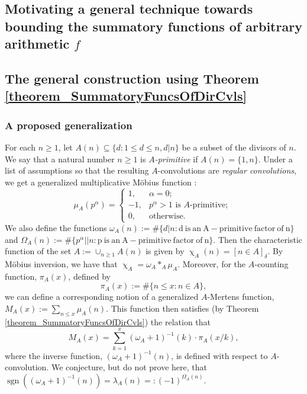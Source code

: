 \documentclass[11pt,reqno,a4letter]{article}
\numberwithin{figure}{section}
\numberwithin{table}{section}
\newcommand{\Iverson}[1]{\ensuremath{\left[#1\right]_{\delta}}}
\renewcommand{\chi}{\upchi}
\theoremstyle{plain}
\numberwithin{theorem}{section}
\theoremstyle{definition}
\begin{document}
\subsection{Motivating a general technique towards bounding the summatory functions of arbitrary arithmetic $f$} 

\subsection{The general construction using Theorem \ref{theorem_SummatoryFuncsOfDirCvls}} 


\subsubsection{A proposed generalization} 

For each $n \geq 1$, let $A(n) \subseteq \{d: 1 \leq d \leq n, d|n\}$ be a subset of the 
divisors of $n$. We say that a natural number $n \geq 1$ is \emph{$A$-primitive} if $A(n) = \{1, n\}$. 
Under a list of assumptions so that the resulting $A$-convolutions are \emph{regular convolutions}, 
we get a generalized multiplicative M\"obius function \cite[\S 2.2]{HANDBOOKNT-2004}: 
\[
\mu_A(p^{\alpha}) = \begin{cases} 
     1, & \alpha = 0; \\ 
     -1, & p^{\alpha} > 1\text{\ is $A$-primitive; } \\ 
     0, & \text{otherwise.}
     \end{cases} 
\]
We also define the functions $\omega_A(n) := \#\{d | n: \mathrm{d\ is\ an\ A-primitive\ factor\ of\ n}\}$ and 
$\Omega_A(n) := \#\{p^{\alpha} || n: \mathrm{p\ is\ an\ A-primitive\ factor\ of\ n}\}$. Then the characteristic 
function of the set $A := \cup_{n \geq 1} A(n)$ is given by $\chi_A(n) = \Iverson{n \in A}$. By M\"obius inversion, 
we have that $\chi_A = \omega_A \ast_A \mu_A$. Moreover, for the $A$-counting function, $\pi_A(x)$, defined by 
\[
\pi_A(x) := \#\{n \leq x: n \in A\}, 
\]
we can define a corresponding notion of a generalized $A$-Mertens function, $M_A(x) := \sum_{n \leq x} \mu_A(n)$. 
This function then satisfies (by Theorem \ref{theorem_SummatoryFuncsOfDirCvls}) the relation that 
\[
M_A(x) = \sum_{k=1}^{x} (\omega_A + 1)^{-1}(k) \cdot \pi_A(x/k), 
\]
where the inverse function, $(\omega_A + 1)^{-1}(n)$, is defined with respect to $A$-convolution. 
We conjecture, but do not prove here, that 
$\operatorname{sgn}((\omega_A + 1)^{-1}(n)) = \lambda_A(n) =: (-1)^{\Omega_A(n)}$. 
\end{document}

